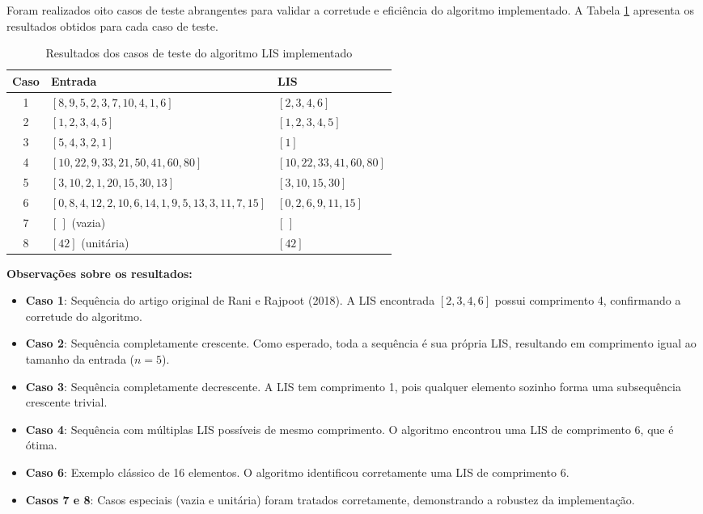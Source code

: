 \documentclass[por]{ajceam-class}
\begin{document}
Foram realizados oito casos de teste abrangentes para validar a corretude e eficiência do algoritmo implementado. A Tabela \ref{tab:casos_teste} apresenta os resultados obtidos para cada caso de teste.

\begin{table}[htbp]
\centering
\caption{Resultados dos casos de teste do algoritmo LIS implementado}
\label{tab:casos_teste}
\footnotesize
\begin{tabular}{|c|p{4.5cm}|p{3.5cm}|}
\hline
\textbf{Caso} & \textbf{Entrada} & \textbf{LIS} \\
\hline
1 & $[8, 9, 5, 2, 3, 7, 10, 4, 1, 6]$ & $[2, 3, 4, 6]$ \\
\hline
2 & $[1, 2, 3, 4, 5]$& $[1, 2, 3, 4, 5]$ \\
\hline
3 & $[5, 4, 3, 2, 1]$ & $[1]$ \\
\hline
4 & $[10, 22, 9, 33, 21, 50, 41, 60, 80]$  & $[10, 22, 33, 41, 60, 80]$ \\
\hline
5 & $[3, 10, 2, 1, 20, 15, 30, 13]$ & $[3, 10, 15, 30]$ \\
\hline
6 & $[0, 8, 4, 12, 2, 10, 6, 14, 1, 9, 5, 13, 3, 11, 7, 15]$  & $[0, 2, 6, 9, 11, 15]$ \\
\hline
7 & $[\,]$ (vazia) & $[\,]$ \\
\hline
8 & $[42]$ (unitária) & $[42]$ \\
\hline
\end{tabular}
\end{table}

\textbf{Observações sobre os resultados:}

\begin{itemize}
    \item \textbf{Caso 1}: Sequência do artigo original de Rani e Rajpoot (2018). A LIS encontrada $[2, 3, 4, 6]$ possui comprimento 4, confirmando a corretude do algoritmo.
    
    \item \textbf{Caso 2}: Sequência completamente crescente. Como esperado, toda a sequência é sua própria LIS, resultando em comprimento igual ao tamanho da entrada ($n=5$).
    
    \item \textbf{Caso 3}: Sequência completamente decrescente. A LIS tem comprimento 1, pois qualquer elemento sozinho forma uma subsequência crescente trivial.
    
    \item \textbf{Caso 4}: Sequência com múltiplas LIS possíveis de mesmo comprimento. O algoritmo encontrou uma LIS de comprimento 6, que é ótima.
    
    \item \textbf{Caso 6}: Exemplo clássico de 16 elementos. O algoritmo identificou corretamente uma LIS de comprimento 6.
    
    \item \textbf{Casos 7 e 8}: Casos especiais (vazia e unitária) foram tratados corretamente, demonstrando a robustez da implementação.
\end{itemize}
\end{document}
